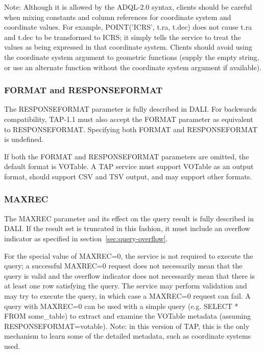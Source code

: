 \documentclass[11pt,letter]{ivoa}
\begin{document}
Note: Although it is allowed by the ADQL-2.0 syntax, clients should be careful when 
mixing constants and column references for coordinate system and coordinate 
values. For example, POINT('ICRS', t.ra, t.dec) does not cause t.ra and t.dec to 
be transformed to ICRS; it simply tells the service to treat the values  as 
being expressed in that coordinate system. Clients should avoid using the coordinate 
system argument to geometric functions (supply the empty string, or use an 
alternate function without the coordinate system argument if available).

\subsubsection{FORMAT and RESPONSEFORMAT}
\label{sec:RESPONSEFORMAT}

The RESPONSEFORMAT parameter is fully described in DALI. For 
backwards 
compatibility, TAP-1.1 must also accept the FORMAT parameter as equivalent to 
RESPONSEFORMAT.  
Specifying both FORMAT and RESPONSEFORMAT is undefined.

If both the FORMAT and RESPONSEFORMAT parameters are omitted, the
default format is VOTable.  A TAP service must support VOTable as an
output format, should support CSV and TSV output, and may support other
formats.

\subsubsection{MAXREC}
\label{sec:MAXREC}

The MAXREC parameter and its effect on the query result is fully described in 
DALI. If the result set is truncated in this fashion, it must 
include an overflow indicator as specified in section~\ref{sec:query-overflow}.

For the special value of MAXREC=0, the service is not required to execute the 
query; a successful  MAXREC=0 request does not necessarily mean that the query 
is valid and the overflow indicator does not necessarily mean that there is at 
least one row satisfying the query. The service may perform validation and may 
try to execute the query, in which case a MAXREC=0 request can fail. A query 
with MAXREC=0 can be used with a simple query (e.g. SELECT * FROM  
some\_table) to extract and examine the VOTable metadata (assuming 
RESPONSEFORMAT=votable). Note: in this version of TAP, this is the only mechanism to 
learn some of the detailed metadata, such as coordinate systems used.
\end{document}
